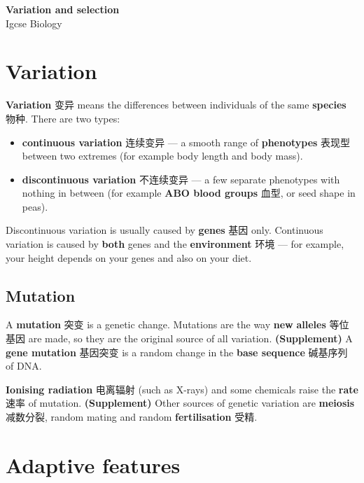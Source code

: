 \documentclass[11pt]{article}
\begin{document}
\begin{center}
  {\LARGE\bfseries Variation and selection}\\[0.35em]
  {\large Igcse Biology}
\end{center}
\vspace{0.6em}

\section*{Variation}

\textbf{Variation} 变异 means the differences between individuals of the same \textbf{species} 物种. There are two types:

\begin{itemize}
\item \textbf{continuous variation} 连续变异 — a smooth range of \textbf{phenotypes} 表现型 between two extremes (for example body length and body mass).

\item \textbf{discontinuous variation} 不连续变异 — a few separate phenotypes with nothing in between (for example \textbf{ABO blood groups} 血型, or seed shape in peas).

\end{itemize}

Discontinuous variation is usually caused by \textbf{genes} 基因 only. Continuous variation is caused by \textbf{both} genes and the \textbf{environment} 环境 — for example, your height depends on your genes and also on your diet.

\subsection*{Mutation}

A \textbf{mutation} 突变 is a genetic change. Mutations are the way \textbf{new} \textbf{alleles} 等位基因 are made, so they are the original source of all variation. \textbf{(Supplement)} A \textbf{gene mutation} 基因突变 is a random change in the \textbf{base sequence} 碱基序列 of DNA.

\textbf{Ionising radiation} 电离辐射 (such as X-rays) and some chemicals raise the \textbf{rate} 速率 of mutation. \textbf{(Supplement)} Other sources of genetic variation are \textbf{meiosis} 减数分裂, random mating and random \textbf{fertilisation} 受精.

\section*{Adaptive features}
\end{document}
